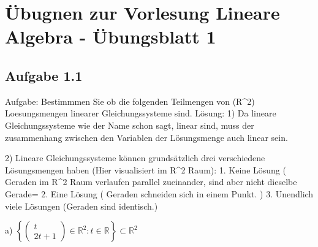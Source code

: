 \documentclass[11pt]{article}
\begin{document}
    \section{Übugnen zur Vorlesung Lineare Algebra - Übungsblatt 1}

    \subsection{Aufgabe 1.1}
    Aufgabe: Bestimmmen Sie ob die folgenden Teilmengen von (R^2) Loesungsmengen linearer Gleichungssysteme sind.
    Lösung:
        1) Da lineare Gleichungssysteme wie der Name schon sagt, linear sind, muss der zusammenhang zwischen den Variablen der Lösungsmenge auch linear sein.

        2) Lineare Gleichungssysteme können grundsätzlich drei verschiedene Lösungsmengen haben (Hier visualisiert im R^2 Raum):
            1. Keine Lösung ( Geraden im R^2 Raum verlaufen parallel zueinander, sind aber nicht dieselbe Gerade=
            2. Eine Lösung ( Geraden schneiden sich in einem Punkt. )
            3. Unendlich viele Lösungen (Geraden sind identisch.)

    a) $\left\{ \begin{pmatrix} t \\ 2t+1 \end{pmatrix} \in \mathbb{R}^2 : t \in \mathbb{R} \right\} \subset \mathbb{R}^2$







    
    
\end{document}
